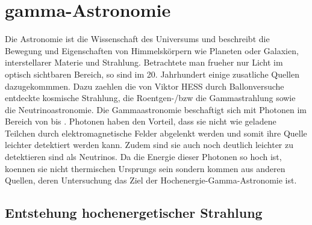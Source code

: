 \chapter{gamma-Astronomie}
Die Astronomie ist die Wissenschaft des Universums und beschreibt die Bewegung und Eigenschaften von Himmelskörpern wie Planeten oder Galaxien, interstellarer Materie und Strahlung. Betrachtete man frueher nur Licht im optisch sichtbaren Bereich, so sind im 20. Jahrhundert einige zusatliche Quellen dazugekommmen. Dazu zaehlen die von Viktor HESS durch Ballonversuche entdeckte kosmische Strahlung, die Roentgen-/bzw die Gammastrahlung sowie die Neutrinoastronomie. Die Gammaastronomie beschaftigt sich mit Photonen im Bereich von bis . Photonen haben den Vorteil, dass sie nicht wie geladene Teilchen durch elektromagnetische Felder abgelenkt werden und somit ihre Quelle leichter detektiert werden kann. Zudem sind sie auch noch deutlich leichter zu detektieren sind als Neutrinos. Da die Energie dieser Photonen so hoch ist, koennen sie nicht thermischen Ursprungs sein sondern kommen aus anderen Quellen, deren Untersuchung das Ziel der Hochenergie-Gamma-Astronomie ist.


\section{Entstehung hochenergetischer Strahlung}

